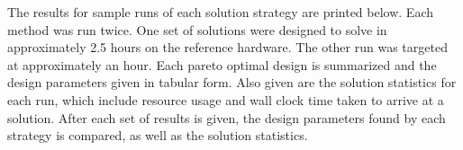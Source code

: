 The results for sample runs of each solution strategy are printed below. Each method was run twice. One set of solutions were designed to solve in approximately 2.5 hours on the reference hardware. The other run was targeted at approximately an hour. Each pareto optimal design is summarized and the design parameters given in tabular form. Also given are the solution statistics for each run, which include resource usage and wall clock time taken to arrive at a solution. After each set of results is given, the design parameters found by each strategy is compared, as well as the solution statistics. 
